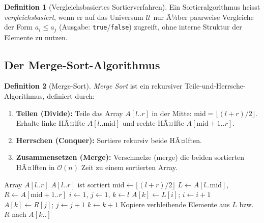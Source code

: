 ﻿\documentclass[a4paper,12pt]{article}
\theoremstyle{definition}
\newtheorem{definition}{Definition}
\begin{document}
\begin{definition}[Vergleichsbasiertes Sortierverfahren]
    Ein Sortieralgorithmus heisst \emph{vergleichsbasiert}, wenn er auf das
    Universum $\mathcal{U}$ nur Ã¼ber paarweise Vergleiche der Form $a_i \leq a_j$
    (Ausgabe: \texttt{true}/\texttt{false}) zugreift, ohne interne Struktur
    der Elemente zu nutzen.
\end{definition}

\subsection{Der Merge-Sort-Algorithmus}

\begin{definition}[Merge-Sort]
    \emph{Merge Sort} ist ein rekursiver Teile-und-Herrsche-Algorithmus,
    definiert durch:
    \begin{enumerate}
        \item \textbf{Teilen (Divide):} Teile das Array $A[l..r]$ in der Mitte:
              $\mathrm{mid} = \lfloor (l+r)/2 \rfloor$.
              Erhalte linke HÃ¤lfte $A[l..\mathrm{mid}]$ und rechte HÃ¤lfte
              $A[\mathrm{mid}+1..r]$.
        \item \textbf{Herrschen (Conquer):} Sortiere rekursiv beide HÃ¤lften.
        \item \textbf{Zusammensetzen (Merge):} Verschmelze (merge) die beiden
              sortierten HÃ¤lften in $\mathcal{O}(n)$ Zeit zu einem sortierten Array.
    \end{enumerate}
\end{definition}

\begin{algorithm}[H]
\caption{Merge Sort}
\label{alg:mergesort}
\begin{algorithmic}[1]
\Require Array $A[l..r]$
\Ensure $A[l..r]$ ist sortiert
        \State $\mathrm{mid} \gets \lfloor (l + r) / 2 \rfloor$
        \State {}
        \State {}
        \State {}
    \EndIf
\EndProcedure
{}
    \State $L \gets A[l..\mathrm{mid}]$, $R \gets A[\mathrm{mid}+1..r]$
    \State $i \gets 1$, $j \gets 1$, $k \gets l$
            \State $A[k] \gets L[i]$; $i \gets i + 1$
        \Else
            \State $A[k] \gets R[j]$; $j \gets j + 1$
        \EndIf
        \State $k \gets k + 1$
    \EndWhile
    \State Kopiere verbleibende Elemente aus $L$ bzw.\ $R$ nach $A[k..]$
\EndProcedure
\end{algorithmic}
\end{algorithm}
\end{document}
